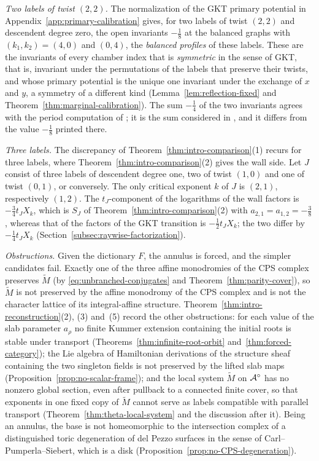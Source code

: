 \emph{Two labels of twist $(2,2)$.}  The normalization of the GKT primary
potential in Appendix~\ref{app:primary-calibration} gives, for two labels of
twist $(2,2)$ and descendent degree zero, the open invariants $-\frac18$ at
the balanced graphs with $(k_1,k_2)=(4,0)$ and $(0,4)$, the \emph{balanced
profiles} of these labels.  These are the invariants of every chamber index
that is \emph{symmetric} in the sense of GKT, that is, invariant under the
permutations of the labels that preserve their twists, and whose primary
potential is the unique one invariant under the exchange of $x$ and $y$, a
symmetry of a different kind (Lemma~\ref{lem:reflection-fixed} and
Theorem~\ref{thm:marginal-calibration}).  The sum $-\frac14$ of the two
invariants agrees with
the period computation of \cite[Rem.~4.3]{wuebben2026boundary}; it is the
sum considered in \cite[Ex.~5.5]{grossetal2026survey}, and it differs from
the value $-\frac18$ printed there.

\emph{Three labels.}  The discrepancy of
Theorem~\ref{thm:intro-comparison}(1) recurs for three labels, where
Theorem~\ref{thm:intro-comparison}(2) gives the wall side.  Let $J$ consist
of three labels of descendent degree one, two of twist $(1,0)$ and one of
twist $(0,1)$, or conversely.  The only critical exponent $k$ of $J$ is
$(2,1)$, respectively $(1,2)$.  The $t_J$-component of the logarithms of the
wall factors is $-\frac34t_JX_k$, which is $S_J$ of
Theorem~\ref{thm:intro-comparison}(2) with $a_{2,1}=a_{1,2}=-\frac38$,
whereas that of the factors of the GKT transition is $-\frac12t_JX_k$; the
two differ by
$-\frac14t_JX_k$ (Section~\ref{subsec:raywise-factorization}).

\emph{Obstructions.}  Given the dictionary $F$, the annulus is forced, and
the simpler candidates fail.  Exactly one of the three affine monodromies of
the CPS complex preserves $\widetilde M$ (by \eqref{eq:unbranched-conjugates}
and Theorem~\ref{thm:parity-cover}), so $\widetilde M$ is not preserved by
the affine monodromy of the CPS complex and is not the character lattice of
its integral-affine structure.
Theorem~\ref{thm:intro-reconstruction}(2), (3) and~(5) record the other
obstructions: for each value of the slab parameter $a_\rho$ no finite Kummer
extension containing the initial roots is stable under transport
(Theorems~\ref{thm:infinite-root-orbit} and~\ref{thm:forced-category}); the
Lie algebra of Hamiltonian derivations of the structure sheaf containing the
two singleton fields is not preserved by the lifted slab maps
(Proposition~\ref{prop:no-scalar-frame}); and the local system
$\widetilde M$ on $\mathcal A^\circ$ has no nonzero global section, even after
pullback to a connected finite cover, so that exponents in one fixed copy of
$\widetilde M$ cannot serve as labels compatible with parallel transport
(Theorem~\ref{thm:theta-local-system} and the discussion after it).  Being an annulus, the base
is not homeomorphic to the intersection complex of a distinguished toric
degeneration of del Pezzo surfaces in the sense of Carl--Pumperla--Siebert,
which is a disk (Proposition~\ref{prop:no-CPS-degeneration}).


